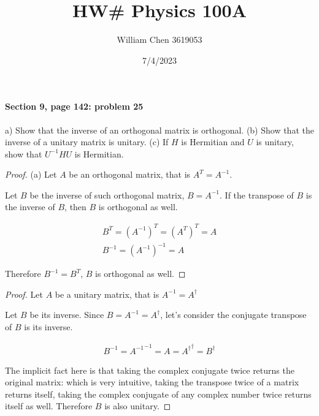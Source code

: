 \documentclass{article}
\title{HW\# Physics 100A}
\date{7/4/2023}
\author{William Chen 3619053}
\begin{document}
\maketitle

\paragraph{Section 9, page 142:  problem 25}
a) Show that the inverse of an orthogonal matrix is orthogonal. (b) Show that the inverse of a unitary matrix is unitary. (c) If $H$ is Hermitian and $U$ is unitary, show that $U^{-1}HU$ is Hermitian.

\begin{proof}
(a) Let $A$ be an orthogonal matrix, that is $A^{T} = A^{-1}$. 

Let $B$ be the inverse of such orthogonal matrix, $B = A^{-1}$. If the transpose of $B$ is the inverse of $B$, then $B$ is orthogonal as well.

\begin{align*}
B^T = (A^{-1})^T = (A^T)^T = A\\
B^{-1} = (A^{-1})^{-1} = A
\end{align*}

Therefore $B^{-1} = B^{T}$, $B$ is orthogonal as well.
\end{proof}

\begin{proof}
Let $A$ be a unitary matrix, that is $A^{-1} = A^{\dagger}$

Let $B$ be its inverse. Since $B = A^{-1} = A^{\dagger}$, let's consider the conjugate transpose of $B$ is its inverse.

\begin{align*}
B^{-1} = {A^{-1}}^{-1} = A = {A^{\dagger}}^{\dagger} = B^{\dagger}
\end{align*}

The implicit fact here is that taking the complex conjugate twice returns the original matrix: which is very intuitive, taking the transpose twice of a matrix returns itself, taking the complex conjugate of any complex number twice returns itself as well. Therefore $B$ is also unitary.

\end{proof}
\end{document}
